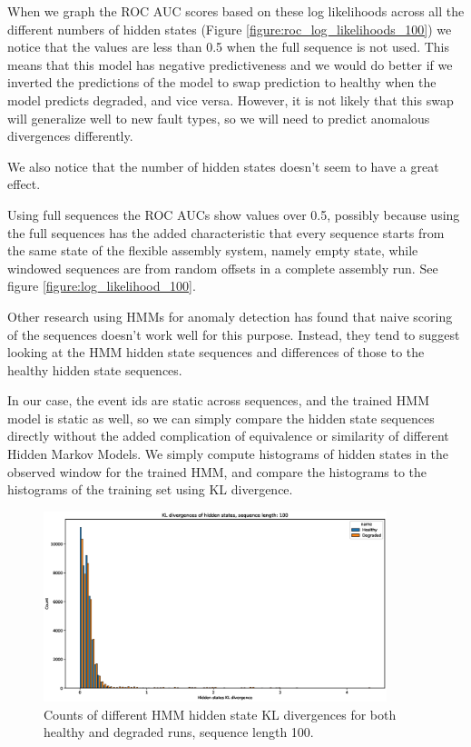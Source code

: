\documentclass[journal]{IEEEtran}
\begin{document}
When we graph the ROC AUC scores based on these log likelihoods across all the different numbers of hidden states (Figure \ref{figure:roc_log_likelihoods_100}) we notice that the values are less than 0.5 when the full sequence is not used. This means that this model has negative predictiveness and we would do better if we inverted the predictions of the model to swap prediction to healthy when the model predicts degraded, and vice versa. However, it is not likely that this swap will generalize well to new fault types, so we will need to predict anomalous divergences differently.

We also notice that the number of hidden states doesn't seem to have a great effect.

Using full sequences the ROC AUCs show values over 0.5, possibly because using the full sequences has the added characteristic that every sequence starts from the same state of the flexible assembly system, namely empty state, while windowed sequences are from random offsets in a complete assembly run. See figure \ref{figure:log_likelihood_100}.

Other research using HMMs for anomaly detection has found that naive scoring of the sequences doesn't work well for this purpose\cite{gornitz2015hidden}. Instead, they tend to suggest looking at the HMM hidden state sequences and differences of those to the healthy hidden state sequences.

In our case, the event ids are static across sequences, and the trained HMM model is static as well, so we can simply compare the hidden state sequences directly without the added complication of equivalence or similarity of different Hidden Markov Models. We simply compute histograms of hidden states in the observed window for the trained HMM, and compare the histograms to the histograms of the training set using KL divergence.

\begin{figure}[tb]
 \centering
 \includegraphics[width=10cm,keepaspectratio=true]{./kl_histograms_100.eps}
 \caption{Counts of different HMM hidden state KL divergences for both healthy and degraded runs, sequence length 100.}
 \label{figure:kl_100}
\end{figure}
\end{document}
